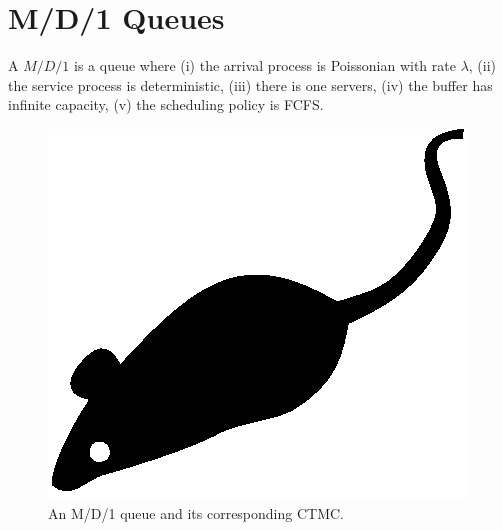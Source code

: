 \section{M/D/1 Queues}
\label{sec:M-D-1-queues}

A $M/D/1$ is a queue where 
(i) the arrival process is Poissonian with rate $\lambda$,
(ii) the service process is deterministic,
(iii) there is one servers,
(iv) the buffer has infinite capacity,
(v) the scheduling policy is FCFS.

\begin{figure}[tp]
\label{fig:M-D-1-queue}	
	\centering
	\includegraphics{fig/M-D-1-Queue}
	\caption{An M/D/1 queue and its corresponding CTMC.}
	\end{figure}
